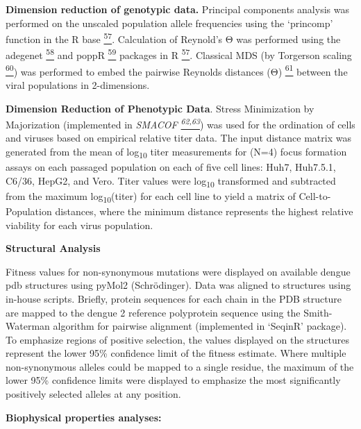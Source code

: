 \documentclass[
]{article}
\begin{document}
\textbf{Dimension reduction of genotypic data.} Principal components
analysis was performed on the unscaled population allele frequencies
using the `princomp' function in the R base
\href{https://paperpile.com/c/REZjPf/uGyfe}{\textsuperscript{57}}.
Calculation of Reynold's Θ was performed using the adegenet
\href{https://paperpile.com/c/REZjPf/V25w7}{\textsuperscript{58}} and
poppR \href{https://paperpile.com/c/REZjPf/TEfJA}{\textsuperscript{59}}
packages in R
\href{https://paperpile.com/c/REZjPf/uGyfe}{\textsuperscript{57}}.
Classical MDS (by Torgerson scaling
\href{https://paperpile.com/c/REZjPf/0m4TS}{\textsuperscript{60}}) was
performed to embed the pairwise Reynolds distances (Θ)
\href{https://paperpile.com/c/REZjPf/8bj1M}{\textsuperscript{61}}
between the viral populations in 2-dimensions.

\textbf{Dimension Reduction of Phenotypic Data}. Stress Minimization by
Majorization (implemented in \emph{SMACOF
\href{https://paperpile.com/c/REZjPf/gUxkc+dJiR3}{\textsuperscript{62,63}}})
was used for the ordination of cells and viruses based on empirical
relative titer data. The input distance matrix was generated from the
mean of log\textsubscript{10} titer measurements for (N=4) focus
formation assays on each passaged population on each of five cell lines:
Huh7, Huh7.5.1, C6/36, HepG2, and Vero. Titer values were
log\textsubscript{10} transformed and subtracted from the maximum
log\textsubscript{10}(titer) for each cell line to yield a matrix of
Cell-to-Population distances, where the minimum distance represents the
highest relative viability for each virus population.

\textbf{Structural Analysis}

Fitness values for non-synonymous mutations were displayed on available
dengue pdb structures using pyMol2 (Schrödinger). Data was aligned to
structures using in-house scripts. Briefly, protein sequences for each
chain in the PDB structure are mapped to the dengue 2 reference
polyprotein sequence using the Smith-Waterman algorithm for pairwise
alignment (implemented in `SeqinR' package). To emphasize regions of
positive selection, the values displayed on the structures represent the
lower 95\% confidence limit of the fitness estimate. Where multiple
non-synonymous alleles could be mapped to a single residue, the maximum
of the lower 95\% confidence limits were displayed to emphasize the most
significantly positively selected alleles at any position.

\textbf{Biophysical properties analyses:}
\end{document}
